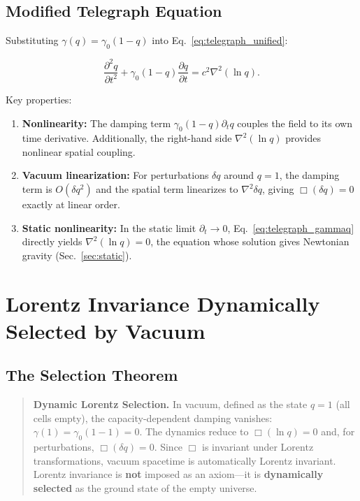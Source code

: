 \documentclass[aps,prd,twocolumn,showpacs,superscriptaddress,preprintnumbers]{revtex4-2}
\begin{document}
\subsection{Modified Telegraph Equation}

Substituting $\gamma(q)=\gamma_0(1-q)$ into Eq.~\eqref{eq:telegraph_unified}:

\begin{equation}
\boxed{\frac{\partial^2 q}{\partial t^2} + \gamma_0(1-q)\frac{\partial q}{\partial t} = c^2\nabla^2(\ln q)}.
\label{eq:telegraph_gammaq}
\end{equation}

Key properties:
\begin{enumerate}
    \item \textbf{Nonlinearity:} The damping term $\gamma_0(1-q)\partial_t q$ couples the field to its own time derivative. Additionally, the right-hand side $\nabla^2(\ln q)$ provides nonlinear spatial coupling.
    \item \textbf{Vacuum linearization:} For perturbations $\delta q$ around $q=1$, the damping term is $O(\delta q^2)$ and the spatial term linearizes to $\nabla^2\delta q$, giving $\Box(\delta q)=0$ exactly at linear order.
    \item \textbf{Static nonlinearity:} In the static limit $\partial_t\to0$, Eq.~\eqref{eq:telegraph_gammaq} directly yields $\nabla^2(\ln q)=0$, the equation whose solution gives Newtonian gravity (Sec.~\ref{sec:static}).
\end{enumerate}

\section{Lorentz Invariance Dynamically Selected by Vacuum}
\label{sec:lorentz}

\subsection{The Selection Theorem}

\begin{quote}
\textbf{Dynamic Lorentz Selection.}
In vacuum, defined as the state $q=1$ (all cells empty), the capacity-dependent damping vanishes: $\gamma(1)=\gamma_0(1-1)=0$.
The dynamics reduce to $\Box(\ln q)=0$ and, for perturbations, $\Box(\delta q)=0$.
Since $\Box$ is invariant under Lorentz transformations, vacuum spacetime is automatically Lorentz invariant.
Lorentz invariance is \textbf{not} imposed as an axiom---it is \textbf{dynamically selected} as the ground state of the empty universe.
\end{quote}
\end{document}
